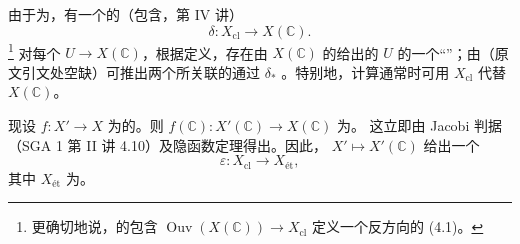 由于为，有一个的（包含，第 IV 讲）
\begin{equation}
 \delta:X_{\mathrm{cl}}\longrightarrow X(\mathbb C).\tag{4.1}
\end{equation}
\footnote{更确切地说，的包含 $\operatorname{Ouv}(X(\mathbb C))\to X_{\mathrm{cl}}$ 定义一个反方向的 (4.1)。}
对每个 $U\to X(\mathbb C)$，根据定义，存在由 $X(\mathbb C)$ 的给出的 $U$ 的一个“”；由（原文引文处空缺）可推出两个所关联的通过 $\delta_*$ 。特别地，计算通常时可用 $X_{\mathrm{cl}}$ 代替 $X(\mathbb C)$。

现设 $f:X'\to X$ 为的。则 $f(\mathbb C):X'(\mathbb C)\to X(\mathbb C)$ 为。
这立即由 Jacobi 判据（SGA 1 第 II 讲 4.10）及隐函数定理得出。因此， $X'\mapsto X'(\mathbb C)$ 给出一个
\begin{equation}
 \varepsilon:X_{\mathrm{cl}}\longrightarrow X_{\text{ét}},\tag{4.2}
\end{equation}
其中 $X_{\text{ét}}$ 为。

